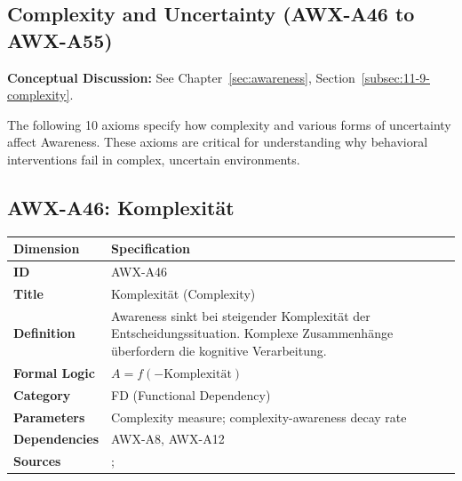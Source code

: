 

\subsection{Complexity and Uncertainty (AWX-A46 to AWX-A55)}

\begin{cross-reference}
\textbf{Conceptual Discussion:} See Chapter~\ref{sec:awareness}, Section~\ref{subsec:11-9-complexity}.
\end{cross-reference}
The following 10 axioms specify how complexity and various forms of uncertainty affect Awareness. These axioms are critical for understanding why behavioral interventions fail in complex, uncertain environments.


\subsection{AWX-A46: Komplexität}

\begin{table}[htbp]
\small
\begin{tabular}{p{3cm}p{11cm}}
\toprule
\textbf{Dimension} & \textbf{Specification} \\
\midrule
\textbf{ID} & AWX-A46 \\
\textbf{Title} & Komplexität (Complexity) \\
\textbf{Definition} & Awareness sinkt bei steigender Komplexität der Entscheidungssituation. Komplexe Zusammenhänge überfordern die kognitive Verarbeitung. \\
\textbf{Formal Logic} & $A = f(-\text{Komplexität})$ \\
\textbf{Category} & FD (Functional Dependency) \\
\textbf{Parameters} & Complexity measure; complexity-awareness decay rate \\
\textbf{Dependencies} & AWX-A8, AWX-A12 \\
\textbf{Sources} & \citet{PAP-simon1955behavioral}; \citet{gigerenzer2002bounded} \\
\bottomrule
\end{tabular}
\end{table}

